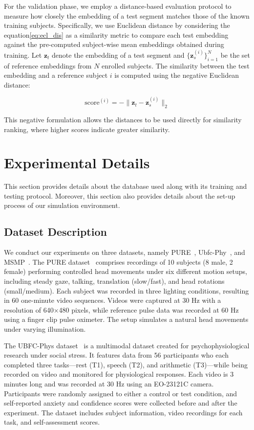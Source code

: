 For the validation phase, we employ a distance-based evaluation protocol to measure how closely the embedding of a test segment matches those of the known training subjects. Specifically, we use Euclidean distance by considering the equation\ref{eq:ecl_dis} as a similarity metric to compare each test embedding against the pre-computed subject-wise mean embeddings obtained during training. Let $\mathbf{z}_t$ denote the embedding of a test segment and $\{\mathbf{z}_s^{(i)}\}_{i=1}^N$ be the set of reference embeddings from $N$ enrolled subjects. The similarity between the test embedding and a reference subject $i$ is computed using the negative Euclidean distance:

\begin{equation}
\text{score}^{(i)} = -\|\mathbf{z}_t - \mathbf{z}_s^{(i)}\|_2
\label{eq:ecl_dis}
\end{equation}


This negative formulation allows the distances to be used directly for similarity ranking, where higher scores indicate greater similarity.

\section{Experimental Details }  This section provides details about the database used along with its training and testing protocol. Moreover, this section also provides details about the set-up process of our simulation environment.

\subsection{Dataset Description} 
We conduct our experiments on three datasets, namely PURE~\cite{ferrari2017pure}, Ubfc-Phy~\cite{sabour2023ubfc}, and  MSMP~\cite{speth2024mspm}. The PURE dataset~\cite{ferrari2017pure} comprises recordings of 10 subjects (8 male, 2 female) performing controlled head movements under six different motion setups, including steady gaze, talking, translation (slow/fast), and head rotations (small/medium). Each subject was recorded in three lighting conditions, resulting in 60 one-minute video sequences. Videos were captured at 30 Hz with a resolution of 640×480 pixels, while reference pulse data was recorded at 60 Hz using a finger clip pulse oximeter. The setup simulates a natural head movements under varying illumination.

The UBFC-Phys dataset~\cite{sabour2023ubfc} is a multimodal dataset created for psychophysiological research under social stress. It features data from 56 participants who each completed three tasks—rest (T1), speech (T2), and arithmetic (T3)—while being recorded on video and monitored for physiological responses. Each video is 3 minutes long and was recorded at 30 Hz using an EO-23121C camera. Participants were randomly assigned to either a control or test condition, and self-reported anxiety and confidence scores were collected before and after the experiment. The dataset includes subject information, video recordings for each task, and self-assessment scores.

